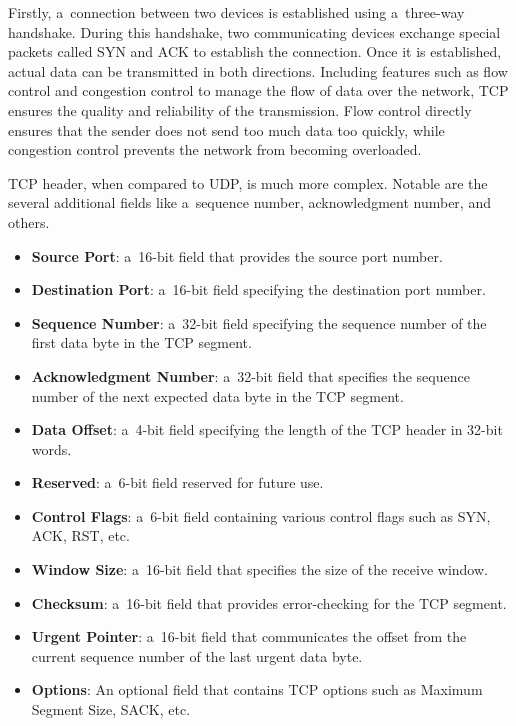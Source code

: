 \documentclass[
  printed,     %
  color,       %
  oneside,     %
  nosansbold,  %
  nocolorbold, %
  nolof,         %
  nolot,         %
]{fithesis4}
\begin{document}
Firstly, a~connection between two devices is established using a~three-way handshake. During this handshake, two communicating devices exchange special packets called SYN and ACK to establish the connection. Once it is established, actual data can be transmitted in both directions. Including features such as flow control and congestion control to manage the flow of data over the network, TCP ensures the quality and reliability of the transmission. Flow control directly ensures that the sender does not send too much data too quickly, while congestion control prevents the network from becoming overloaded.

TCP header, when compared to UDP, is much more complex. Notable are the several additional fields like a~sequence number, acknowledgment number, and others.

\begin{itemize}[noitemsep,topsep=0pt]
    \item \textbf{Source Port}: a~16-bit field that provides the source port number.
    \item \textbf{Destination Port}: a~16-bit field specifying the destination port number.
    \item \textbf{Sequence Number}: a~32-bit field specifying the sequence number of the first data byte in the TCP segment.
    \item \textbf{Acknowledgment Number}: a~32-bit field that specifies the sequence number of the next expected data byte in the TCP segment.
    \item \textbf{Data Offset}: a~4-bit field specifying the length of the TCP header in 32-bit words.
    \item \textbf{Reserved}: a~6-bit field reserved for future use.
    \item \textbf{Control Flags}: a~6-bit field containing various control flags such as SYN, ACK, RST, etc.
    \item \textbf{Window Size}: a~16-bit field that specifies the size of the receive window.
    \item \textbf{Checksum}: a~16-bit field that provides error-checking for the TCP segment.
    \item \textbf{Urgent Pointer}: a~16-bit field that communicates the offset from the current sequence number of the last urgent data byte.
    \item \textbf{Options}: An optional field that contains TCP options such as Maximum Segment Size, SACK, etc.
\end{itemize}
\end{document}
